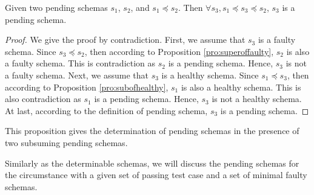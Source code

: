 %
%
%

%
\begin{proposition}\label{pro:pendingsandwich}
Given two pending schemas $s_{1}$, $s_{2}$, and $s_{1} \preceq s_{2}$. Then $\forall s_{3}, s_{1} \preceq s_{3} \preceq s_{2}$, $s_{3}$ is a pending schema.
\end{proposition}

\begin{proof}
We give the proof by contradiction. First, we assume that $s_{3}$ is a faulty schema. Since $s_{3} \preceq s_{2}$, then according to Proposition \ref{pro:superoffaulty}, $s_{2}$ is also a faulty schema. This is contradiction as $s_{2}$ is a pending schema. Hence, $s_{3}$ is not a faulty schema. Next, we assume that $s_{3}$ is a healthy schema.  Since $s_{1} \preceq s_{3}$, then according to Proposition \ref{pro:subofhealthy}, $s_{1}$ is also a healthy schema. This is also contradiction as $s_{1}$ is a pending schema.  Hence, $s_{3}$ is not a healthy schema. At last, according to the definition of pending schema, $s_{3}$ is a pending schema.
\end{proof}

This proposition gives the determination of pending schemas in the presence of two subsuming pending schemas.

Similarly as the determinable schemas, we will discuss the pending schemas for the circumstance with a given set of passing test case and a set of minimal faulty schemas.

